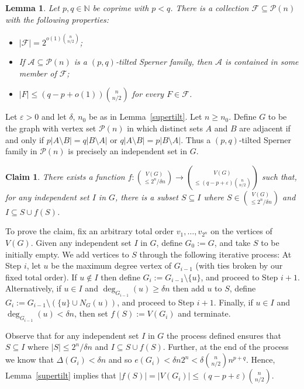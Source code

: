 \documentclass[11pt]{article}
\newtheorem{lemma}[theorem]{Lemma}
\newtheorem{claim}[theorem]{Claim}
\numberwithin{equation}{section}
\def\P{\mathcal{P}}
\def\eps{\varepsilon}
\begin{document}
\begin{lemma}\label{tiltcont} Let $p,q\in \mathbb N$ be coprime with $p<q$.
There is a collection $\mathcal F \subseteq \P(n)$ with the following properties:
\begin{itemize}
\item[(i)]  $|\mathcal F|=2^{o(1)\binom{n}{n/2}}$;
\item[(ii)] If $\mathcal A \subseteq \P(n)$ is a $(p,q)$-tilted Sperner family, then $\mathcal A$ is contained in some member of $\mathcal F$;
\item[(iii)] $|F|\leq (q-p+o(1))\binom{n}{n/2}$ for every $F \in \mathcal F$.
\end{itemize}
\end{lemma}
\proof
Let $\eps >0$ and let $\delta$, $n_0$ be as in Lemma~\ref{supertilt}. Let $n \geq n_0$.
Define $G$ to be the graph with vertex set $\P(n)$ in which distinct sets $A$ and $B$ are adjacent if and only if $p|A \setminus B|=q|B\setminus A|$ or $q|A \setminus B|=p|B\setminus A|$. Thus a $(p,q)$-tilted Sperner family in $\P(n)$ is precisely an independent set in $G$. 

\begin{claim} 
There exists a function $f : \binom{V(G)}{\leq 2^n/\delta n} \to \binom{V(G)}{\leq (q-p+\eps)\binom{n}{n/2}}$  such that, for any independent set $I$ in $G$, there is a subset $S \subseteq I$ where 
$S \in \binom{V(G)}{\leq 2^n/\delta n} $
 and   $I \subseteq S \cup f(S)$. 
\end{claim}
To prove the claim,
fix an arbitrary total order $v_1, \dots, v_{2^n}$ on the vertices of $V(G)$. Given any independent set $I$ in $G$, define $G_0 := G$, and take $S$  to be initially empty. We add vertices to $S$  through the following iterative process:
 At Step $i$, let $u$ be the maximum degree vertex of $G_{i-1}$ (with ties broken by our fixed total order). If $u \notin I$ then define $G_i := G_{i-1} \setminus \{u\}$, and proceed to Step $i+1$. Alternatively, if $u \in I$ and $\deg_{G_{i-1}}(u) \geq \delta n$ then add $u$ to $S$, define $G_i := G_{i-1} \setminus (\{u\} \cup N_G(u))$, and proceed to Step $i+1$. Finally, if $u \in I$ and $\deg_{G_{i-1}}(u) < \delta n$, then set $f(S) := V(G_i)$ and terminate.

Observe that for any independent set $I $ in $G$ the process defined ensures that $S \subseteq I$ where $|S| \leq 2^{n}/\delta n$ and $I \subseteq S \cup f(S)$. Further, at the end of the process we know that
$\Delta (G_i) <\delta n$ and so $e(G_i)<  \delta n 2^n < \delta \binom{n}{n/2} n^{p+q}$. Hence, Lemma~\ref{supertilt} implies that $|f(S)|=|V(G_i)|\leq (q-p+\eps)\binom{n}{n/2}$.
\end{document}

